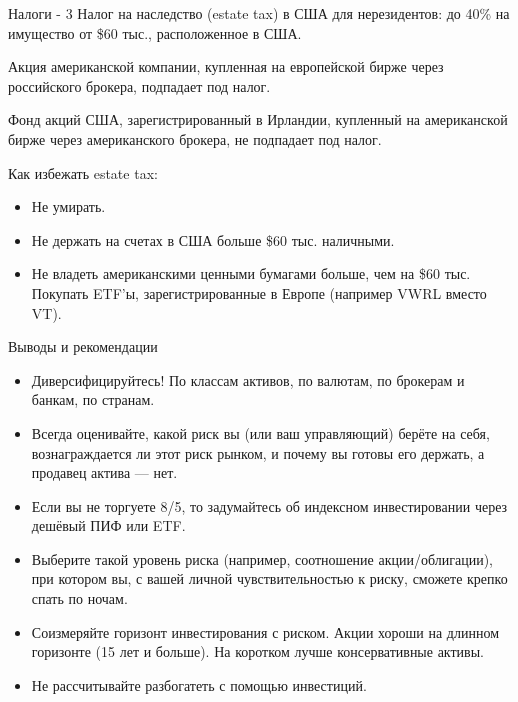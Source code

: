 \documentclass{beamer}
\begin{document}
\begin{frame}{Налоги - 3}
\justify
Налог на наследство (estate tax) в США для нерезидентов: до 40\% на имущество от \$60 тыс., расположенное в США.

\justify
Акция американской компании, купленная на европейской бирже через российского брокера, подпадает под налог.

\justify
Фонд акций США, зарегистрированный в Ирландии, купленный на американской бирже через американского брокера, не подпадает под налог.

\justify
Как избежать estate tax:
\begin{itemize}
\justifying
\item Не умирать.
\item Не держать на счетах в США больше \$60 тыс. наличными.
\item Не владеть американскими ценными бумагами больше, чем на \$60 тыс. Покупать ETF'ы, зарегистрированные в Европе (например VWRL вместо VT).
\end{itemize}
\end{frame}



\begin{frame}{Выводы и рекомендации}
\begin{itemize}
\justifying
\item Диверсифицируйтесь! По классам активов, по валютам, по брокерам и банкам, по странам.
\item Всегда оценивайте, какой риск вы (или ваш управляющий) берёте на себя, вознаграждается ли этот риск рынком, и почему вы готовы его держать, а продавец актива --- нет.
\item Если вы не торгуете 8/5, то задумайтесь об индексном инвестировании через дешёвый ПИФ или ETF.
\item Выберите такой уровень риска (например, соотношение акции/облигации), при котором вы, с вашей личной чувствительностью к риску, сможете крепко спать по ночам.
\item Соизмеряйте горизонт инвестирования с риском. Акции хороши на длинном горизонте (15 лет и больше). На коротком лучше консервативные активы.
\item Не рассчитывайте разбогатеть с помощью инвестиций.
\end{itemize}
\end{frame}
\end{document}
